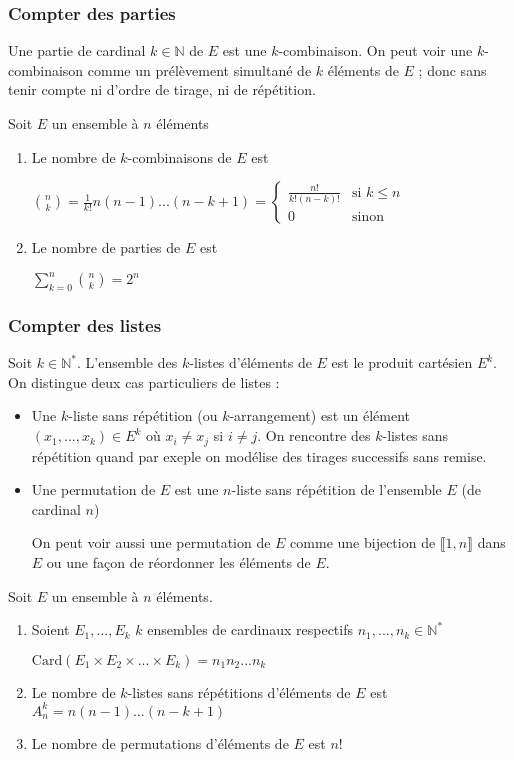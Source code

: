 \documentclass[a4paper,12pt]{book}
\newcommand{\Prop}[2]{\begin{tcolorbox}[sharp corners, colback=white,colframe=red!90!black!75, title=Proposition : #1]#2\end{tcolorbox}}
\def\N{\mathbb{N}}
\begin{document}
\subsubsection{Compter des parties}
Une partie de cardinal $k\in\N$ de $E$ est une $k$-combinaison. On peut voir une $k$-combinaison comme un prélèvement simultané de $k$ éléments de $E$ ; donc sans tenir compte ni d'ordre de tirage, ni de répétition.
\Prop{Nombre de parties}{Soit $E$ un ensemble à $n$ éléments\begin{enumerate}
\item Le nombre de $k$-combinaisons de $E$ est \par\begin{center} $\binom{n}{k}=\frac{1}{k!}n(n-1)...(n-k+1)=\left\{\begin{array}{rl} \frac{n!}{k!(n-k)!} & \text{si $k\leq n$} \\ 0 & \text{sinon}\end{array}\right.$\end{center}
\item Le nombre de parties de $E$ est \par\begin{center}$\sum\limits_{k=0}^n\binom{n}{k}=2^n$\end{center}
\end{enumerate}}
\subsubsection{Compter des listes}
Soit $k\in\N^*$. L'ensemble des $k$-listes d'éléments de $E$ est le produit cartésien $E^k$. On distingue deux cas particuliers de listes :\begin{itemize}
\item Une $k$-liste sans répétition (ou $k$-arrangement) est un élément $(x_1,...,x_k)\in E^k$ où $x_i\neq x_j$ si $i\neq j$. On rencontre des $k$-listes sans répétition quand par exeple on modélise des tirages successifs sans remise.
\item Une permutation de $E$ est une $n$-liste sans répétition de l'ensemble $E$ (de cardinal $n$)
\par On peut voir aussi une permutation de $E$ comme une bijection de $\llbracket 1,n\rrbracket$ dans $E$ ou une façon de réordonner les éléments de $E$.
\end{itemize}
\Prop{Nombre de listes}{Soit $E$ un ensemble à $n$ éléments.\begin{enumerate}
\item Soient $E_1,..., E_k$ $k$ ensembles de cardinaux respectifs $n_1,...,n_k\in\N^*$\par\begin{center}$\mathrm{Card}(E_1\times E_2\times...\times E_k)=n_1n_2...n_k$\end{center}
\item Le nombre de $k$-listes sans répétitions d'éléments de $E$ est $A_n^k = n(n-1)...(n-k+1)$
\item Le nombre de permutations d'éléments de $E$ est $n!$
\end{enumerate}}
\end{document}
